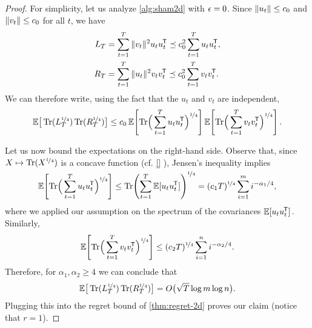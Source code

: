 \begin{proof}
For simplicity, let us analyze \cref{alg:sham2d} with $\eps = 0$.
Since $\norm{u_t} \le c_0$ and $\norm{v_t} \le c_0$ for all $t$, we have
\begin{align*}
L_T &= \sum_{t=1}^T \norm{v_t}^2 u_t u_t\tr \preceq c_0^2 \sum_{t=1}^T u_t u_t\tr ,
\\
R_T &= \sum_{t=1}^T \norm{u_t}^2 v_t v_t\tr \preceq c_0^2 \sum_{t=1}^T v_t v_t\tr .
\end{align*}
We can therefore write, using the fact that the $u_t$ and $v_t$ are independent,
\begin{align*}
\E\Lrbra{ \trace(L_T^\squar) \trace(R_T^\squar) }
\le
c_0 \, \E\lrbra{ \trace\LR{\sum_{t=1}^T u_t u_t\tr}^\squar } \E\lrbra{ \trace\LR{\sum_{t=1}^T v_t v_t\tr}^\squar }
.
\end{align*}

Let us now bound the expectations on the right-hand side.
Observe that, since $X \mapsto \trace(X^\squar)$ is a concave function (cf. \cref{} ), Jensen's inequality implies
\begin{align*}
\E\lrbra{ \trace\LR{\sum_{t=1}^T u_t u_t\tr}^\squar }
\le
\trace\lr{\sum_{t=1}^T \E[u_t u_t\tr]}^{\squar}
=
(c_1 T)^\squar \sum_{i=1}^m i^{-\alpha_1/4}
,
\end{align*}
where we applied our assumption on the spectrum of the covariances $\E[u_t u_t\tr]$.
Similarly,
\begin{align*}
\E\lrbra{ \trace\LR{\sum_{t=1}^T v_t v_t\tr}^\squar }
\le
(c_2 T)^\squar \sum_{i=1}^n i^{-\alpha_2/4}
.
\end{align*}
Therefore, for $\alpha_1, \alpha_2 \ge 4$ we can conclude that
\begin{align*}
\E\Lrbra{ \trace(L_T^\squar) \trace(R_T^\squar) }
=
\O\Lr{ \sqrt{T} \log{m} \log{n} }
.
\end{align*}
Plugging this into the regret bound of \cref{thm:regret-2d} proves our claim (notice that $r=1$).
\end{proof}

